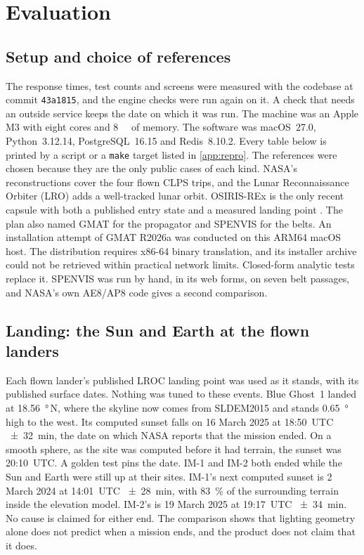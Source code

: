 \documentclass[11pt,a4paper]{article}
\newcommand{\pwcommit}{\texttt{43a1815}}
\begin{document}
\section{Evaluation}
\label{sec:eval}

\subsection{Setup and choice of references}

The response times, test counts and screens were measured with the
codebase at commit \pwcommit{}, and the engine checks were run again on it. A check that needs
an outside service keeps the date on which it was run. The machine was an Apple M3 with eight cores and
\qty{8}{\giga\byte} of memory. The software was macOS~27.0, Python~3.12.14, PostgreSQL~16.15
and Redis~8.10.2. Every table below is printed by a script or a \texttt{make} target
listed in \cref{app:repro}. The references were chosen because they are the only public
cases of each kind. NASA's reconstructions cover the four flown CLPS trips, and the Lunar
Reconnaissance Orbiter (LRO) adds a well-tracked lunar orbit. OSIRIS-REx is the only
recent capsule with both a published entry state and a measured landing point
\citep{wibben2024,francis2024}. The plan also named GMAT for the propagator and SPENVIS for
the belts. An installation attempt of GMAT R2026a was conducted on this ARM64 macOS host.
The distribution requires x86-64 binary translation, and its installer archive could not
be retrieved within practical network limits. Closed-form analytic tests replace it.
SPENVIS \citep{spenvis} was run by hand, in its web forms, on seven belt passages, and NASA's own
AE8/AP8 code gives a second comparison.

\subsection{Landing: the Sun and Earth at the flown landers}

Each flown lander's published LROC landing point was used as it stands, with its
published surface dates. Nothing was tuned to these events. Blue Ghost~1 landed at
\qty{18.56}{\degree}\,N, where the skyline now comes from SLDEM2015 and stands
\qty{0.65}{\degree} high to the west. Its computed sunset falls on 16 March 2025 at 18:50~UTC
\qty{\pm 32}{\minute}, the date on which NASA
reports that the mission ended. On a smooth sphere, as the site was computed before it had
terrain, the sunset was 20:10~UTC. A golden test pins the date. IM-1 and IM-2 both ended while
the Sun and Earth were still up at their sites. IM-1's next computed sunset is 2 March
2024 at 14:01~UTC \qty{\pm 28}{\minute}, with \qty{83}{\percent} of the surrounding
terrain inside the elevation model. IM-2's is 19 March 2025 at 19:17~UTC
\qty{\pm 34}{\minute}. No cause is claimed for either end. The comparison shows that
lighting geometry alone does not predict when a mission ends, and the product does not
claim that it does.
\end{document}
